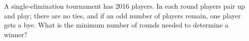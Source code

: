 A single-elimination tournament has $2016$ players. In each round players pair up and play; there are no ties, and if an odd number of players remain, one player gets a bye. What is the minimum number of rounds needed to determine a winner?
